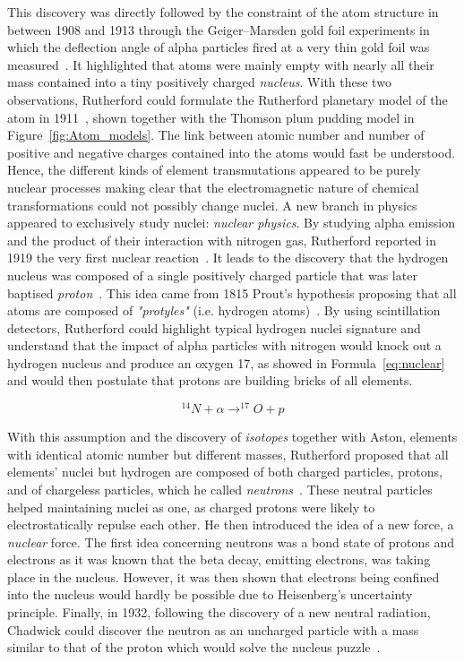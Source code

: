 	This discovery was directly followed by the constraint of the atom structure in between 1908 and 1913 through the Geiger–Marsden gold foil experiments in which the deflection angle of alpha particles fired at a very thin gold foil was measured~\cite{GEIGER1908,GEIGER1909,GEIGER1910,GEIGER1913}. It highlighted that atoms were mainly empty with nearly all their mass contained into a tiny positively charged \textit{nucleus}. With these two observations, Rutherford could formulate the Rutherford planetary model of the atom in 1911~\cite{RUTHERFORD1911}, shown together with the Thomson plum pudding model in Figure~\ref{fig:Atom_models}. The link between atomic number and number of positive and negative charges contained into the atoms would fast be understood. Hence, the different kinds of element transmutations appeared to be purely nuclear processes making clear that the electromagnetic nature of chemical transformations could not possibly change nuclei. A new branch in physics appeared to exclusively study nuclei: \textit{nuclear physics}. By studying alpha emission and the product of their interaction with nitrogen gas, Rutherford reported in 1919 the very first nuclear reaction~\cite{RUTHERFORD1919}. It leads to the discovery that the hydrogen nucleus was composed of a single positively charged particle that was later baptised \textit{proton}~\cite{MASSON1921}. This idea came from 1815 Prout's hypothesis proposing that all atoms are composed of \textit{"protyles"} (i.e. hydrogen atoms)~\cite{PROUT1815,PROUT1816}. By using scintillation detectors, Rutherford could highlight typical hydrogen nuclei signature and understand that the impact of alpha particles with nitrogen would knock out a hydrogen nucleus and produce an oxygen 17, as showed in Formula~\ref{eq:nuclear} and would then postulate that protons are building bricks of all elements.
	
	\begin{equation}
		\label{eq:nuclear}
		^{14}N + \alpha \rightarrow ^{17}O + p
	\end{equation}
	
	With this assumption and the discovery of \textit{isotopes} together with Aston, elements with identical atomic number but different masses, Rutherford proposed that all elements' nuclei but hydrogen are composed of both charged particles, protons, and of chargeless particles, which he called \textit{neutrons}~\cite{RUTHERFORD1920,MASSON1921}. These neutral particles helped maintaining nuclei as one, as charged protons were likely to electrostatically repulse each other. He then introduced the idea of a new force, a \textit{nuclear} force. The first idea concerning neutrons was a bond state of protons and electrons as it was known that the beta decay, emitting electrons, was taking place in the nucleus. However, it was then shown that electrons being confined into the nucleus would hardly be possible due to Heisenberg's uncertainty principle. Finally, in 1932, following the discovery of a new neutral radiation, Chadwick could discover the neutron as an uncharged particle with a mass similar to that of the proton which would solve the nucleus puzzle~\cite{BOTHE1930,BOTHE1932,CURIE1932,CHADWICK1932,CHADWICK1933}.
	

